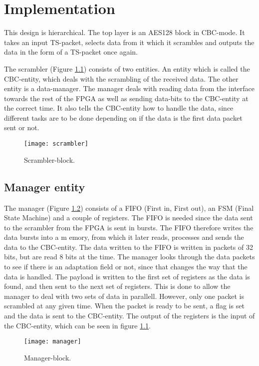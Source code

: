 \chapter{Implementation}\label{ch:implementation}
This design is hierarchical. The top layer is an AES128 block in 
CBC-mode. It takes an input TS-packet, selects data from it which it 
scrambles and outputs the data in the form of a TS-packet once 
again.

The scrambler (Figure \ref{block:scrambler}) consists of two entities. 
An entity which is called the CBC-entity, which deals with the 
scrambling of the received data. The other entity is a data-manager. 
The manager deals with reading data from the interface towards the 
rest of the FPGA as well as sending data-bits to the CBC-entity at the 
correct time. It also tells the CBC-entity how to handle the data, 
since different tasks are to be done depending on if the data is the 
first data packet sent or not.

\begin{figure}[h!]
  \centering
  \texttt{[image: scrambler]}
  \caption{Scrambler-block.}
  \label{block:scrambler}
\end{figure}

\section{Manager entity}
The manager (Figure \ref{block:manager}) consists of a FIFO (First in, 
First out), an FSM (Final State Machine) and a couple of registers. 
The FIFO is needed since the data sent to the scrambler from the FPGA 
is sent in bursts. The FIFO therefore writes the data bursts into a m
emory, from which it later reads, processes and sends the data to the 
CBC-entity. The data written to the FIFO is written in packets of 32 
bits, but are read 8 bits at the time. The manager looks through the 
data packets to see if there is an adaptation field or not, since that 
changes the way that the data is handled. The payload is written to 
the first set of registers as the data is found, and then sent to the 
next set of registers. This is done to allow the manager to deal with 
two sets of data in parallell. However, only one packet is scrambled 
at any given time. When the packet is ready to be sent, a flag is set 
and the data is sent to the CBC-entity. The output of the registers 
is the input of the CBC-entity, which can be seen in figure 
\ref{block:scrambler}.

\begin{figure}[h!]
  \centering
  \texttt{[image: manager]}
  \caption{Manager-block.}
  \label{block:manager}
\end{figure}

